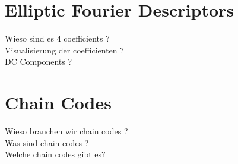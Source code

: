 \documentclass[thesis.tex]{subfiles}
\begin{document}
\section{Elliptic Fourier Descriptors}
Wieso sind es 4 coefficients ? \\
Visualisierung der coefficienten ? \\
DC Components ?

\section{Chain Codes}
Wieso brauchen wir chain codes ? \\
Was sind chain codes ? \\
Welche chain codes gibt es? 



\subfilebib %
\end{document}
